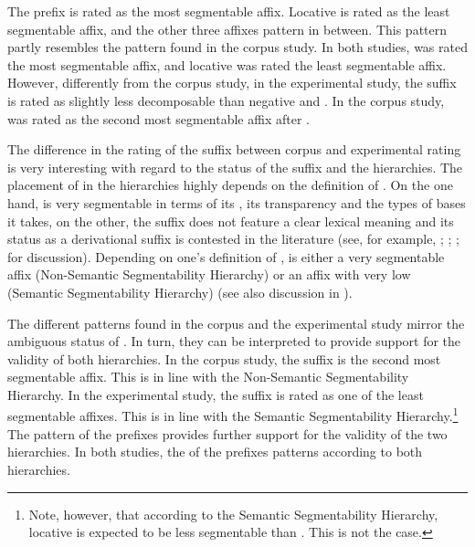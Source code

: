 The prefix  is rated as the most segmentable affix. 
 Locative  is rated as the least segmentable affix, and the other three affixes pattern in between. 
  This pattern partly resembles the pattern found in the corpus study. In both studies,  was rated the most segmentable affix, and locative  was rated the least segmentable affix. 
 However, differently from the corpus study, in the experimental study, the suffix  is rated as slightly less decomposable than negative  and . In the corpus study,  was rated as the second most segmentable affix after .


The difference in the rating of the suffix  between corpus and experimental rating is very interesting with regard to the  status of the suffix and the  hierarchies. The placement of  in the  hierarchies highly depends on the definition of . On the one hand,  is very segmentable in terms of its , its transparency and the types of bases it takes, on the other, the suffix does not feature a clear lexical meaning and its status as a derivational suffix is contested in the literature (see, for example, \citealt{Zwicky.1995}; \citealt{Plag.2003}; \citealt{Giegerich.2012}; \citealt{Bauer.2013} for discussion). Depending on one's definition of ,  is either a very segmentable affix (Non-Semantic Segmentability Hierarchy) or an affix with very low  (Semantic Segmentability Hierarchy) (see also discussion in ). 

The different  patterns found in the corpus and the experimental study mirror the ambiguous  status of . In turn, they can be interpreted to provide support for the validity of both  hierarchies. 
In the corpus study, the suffix  is the second most segmentable affix. This is in line with the Non-Semantic Segmentability Hierarchy. 
In the experimental study, the suffix  is rated as one of the least segmentable affixes. This is in line with the Semantic Segmentability Hierarchy.\footnote{Note, however, that according to the Semantic Segmentability Hierarchy, locative  is expected to be less segmentable than . This is not the case. }
The  pattern of the prefixes provides further support for the validity of the two hierarchies. In both studies, the  of the prefixes patterns according to both hierarchies. 




